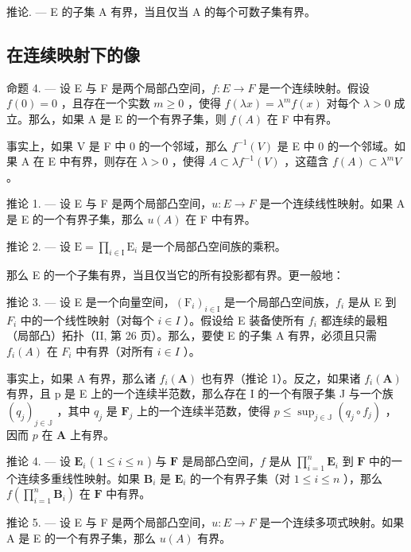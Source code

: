 推论. --- E 的子集 A 有界，当且仅当 A 的每个可数子集有界。

\subsection{在连续映射下的像}

命题 4. --- 设 E 与 F 是两个局部凸空间，\(f:E \rightarrow F\) 是一个连续映射。假设 \(f(0) = 0\) ，且存在一个实数 \(m \geqslant 0\) ，使得 \(f(\lambda x) = \lambda^{m}f(x)\) 对每个 \(\lambda > 0\) 成立。那么，如果 A 是 E 的一个有界子集，则 \(f(A)\) 在 F 中有界。

事实上，如果 V 是 F 中 0 的一个邻域，那么 \(f^{-1}(V)\) 是 E 中 0 的一个邻域。如果 A 在 E 中有界，则存在 \(\lambda > 0\) ，使得 \(A \subset \lambda f^{-1}(V)\) ，这蕴含 \(f(A) \subset \lambda^{m}V\) 。

推论 1. --- 设 E 与 F 是两个局部凸空间，\(u:E\to F\) 是一个连续线性映射。如果 A 是 E 的一个有界子集，那么 \(u(A)\) 在 F 中有界。

推论 2. --- 设 \(\mathrm{E} = \prod_{i\in \mathrm{I}}\mathrm{E}_i\) 是一个局部凸空间族的乘积。

那么 E 的一个子集有界，当且仅当它的所有投影都有界。更一般地：

推论 3. --- 设 E 是一个向量空间，\((\mathrm{F}_{i})_{i\in\mathrm{I}}\) 是一个局部凸空间族，\(f_{i}\) 是从 E 到 \(F_{i}\) 中的一个线性映射（对每个 \(i\in I\) ）。假设给 E 装备使所有 \(f_{i}\) 都连续的最粗（局部凸）拓扑（II, 第 26 页）。那么，要使 E 的子集 A 有界，必须且只需 \(f_{i}(A)\) 在 \(F_{i}\) 中有界（对所有 \(i\in I\) ）。

事实上，如果 A 有界，那么诸 \(f_{i}(\mathbf{A})\) 也有界（推论 1）。反之，如果诸 \(f_{i}(\mathbf{A})\) 有界，且 p 是 E 上的一个连续半范数，那么存在 I 的一个有限子集 J 与一个族 \((q_{j})_{j\in \mathbb{J}}\) ，其中 \(q_{j}\) 是 \(\mathbf{F}_j\) 上的一个连续半范数，使得 \(p\leqslant \sup_{j\in \mathbb{J}}(q_j\circ f_j)\) ，因而 \(p\) 在 \(\mathbf{A}\) 上有界。

推论 4. --- 设 \(\mathbf{E}_i\) ( \(1 \leqslant i \leqslant n\) ) 与 \(\mathbf{F}\) 是局部凸空间，\(f\) 是从 \(\prod_{i=1}^{n} \mathbf{E}_i\) 到 \(\mathbf{F}\) 中的一个连续多重线性映射。如果 \(\mathbf{B}_i\) 是 \(\mathbf{E}_i\) 的一个有界子集（对 \(1 \leqslant i \leqslant n\) ），那么 \(f\left(\prod_{i=1}^{n} \mathbf{B}_i\right)\) 在 \(\mathbf{F}\) 中有界。

推论 5. --- 设 E 与 F 是两个局部凸空间，\(u:E\to F\) 是一个连续多项式映射。如果 A 是 E 的一个有界子集，那么 \(u(A)\) 有界。

